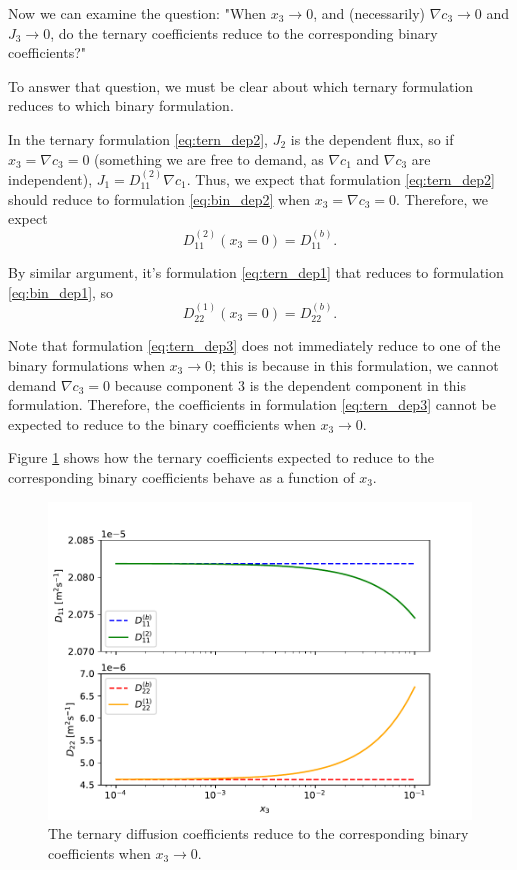 Now we can examine the question: "When $x_3 \to 0$, and (necessarily) $\nabla c_3 \to 0$ and $J_3 \to 0$, do the ternary coefficients reduce to the corresponding binary coefficients?"

To answer that question, we must be clear about which ternary formulation reduces to which binary formulation.

In the ternary formulation \eqref{eq:tern_dep2}, $J_2$ is the dependent flux, so if $x_3 = \nabla c_3 = 0$ (something we are free to demand, as $\nabla c_1$ and $\nabla c_3$ are independent), $J_1 = D_{11}^{(2)} \nabla c_1$. Thus, we expect that formulation \eqref{eq:tern_dep2} should reduce to formulation \eqref{eq:bin_dep2} when $x_3 = \nabla c_3 = 0$. Therefore, we expect
\begin{equation}
    D_{11}^{(2)}(x_3 = 0) = D_{11}^{(b)}.
\end{equation}

By similar argument, it's formulation \eqref{eq:tern_dep1} that reduces to formulation \eqref{eq:bin_dep1}, so
\begin{equation}
    D_{22}^{(1)}(x_3 = 0) = D_{22}^{(b)}.
\end{equation}

Note that formulation \eqref{eq:tern_dep3} does not immediately reduce to one of the binary formulations when $x_3 \to 0$; this is because in this formulation, we cannot demand $\nabla c_3 = 0$ because component 3 is the dependent component in this formulation. Therefore, the coefficients in formulation \eqref{eq:tern_dep3} cannot be expected to reduce to the binary coefficients when $x_3 \to 0$.

Figure \ref{fig:binary_ternary} shows how the ternary coefficients expected to reduce to the corresponding binary coefficients behave as a function of $x_3$.

\begin{figure}[htb]
    \centering
    \includegraphics[width=.75\textwidth]{binary_ternary.pdf}
    \caption{The ternary diffusion coefficients reduce to the corresponding binary coefficients when $x_3 \to 0$.}
    \label{fig:binary_ternary}
\end{figure}



